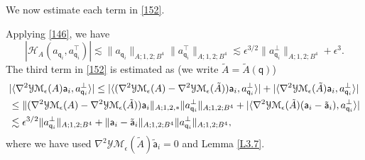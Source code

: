 \documentclass[11pt]{article}
\numberwithin{equation}{section} \setlength{\topmargin}{-35pt}
\newcommand{\YMe}{\mathcal{YM}_{\epsilon}}
\newcommand{\q}{\mathsf{q}}
\newcommand{\A}{\mathsf{a}}
\begin{document}
We now estimate each term in \eqref{152}.

\noindent Applying \eqref{146}, we have
\begin{equation}
\label{153}
|\mathcal{H}_A(a_{\q_i},a_{\q_i}^{\intercal})|\lesssim\|a_{\q_i}\|_{A;1,2;B^4}\|a_{\q_i}^{\intercal}\|_{A;1,2;B^4}
\lesssim\epsilon^{3/2}\|a_{\q_i}^{\perp}\|_{A;1,2;B^4}+\epsilon^3.
\end{equation}
The third term in \eqref{152} is estimated as (we write
$\tilde{A}=\tilde{A}(\q)$)
\begin{align}
\label{154}  &|\langle\nabla^2\YMe(A)\A_i,a_{\q_i}^{\perp}\rangle|
\le|\langle(\nabla^2\YMe(A)-\nabla^2\YMe(\tilde{A}))\A_i,a_{\q_i}^{\perp}\rangle|+
|\langle\nabla^2\YMe(\tilde{A})\A_i,a_{\q_i}^{\perp}\rangle|\notag\\
&\le\|(\nabla^2\YMe(A)-\nabla^2\YMe(\tilde{A}))\A_i\|_{A;1,2,\ast}\|a_{\q_i}^{\perp}\|_{A;1,2;B^4}+
|\langle\nabla^2\YMe(\tilde{A})(\A_i-\tilde{\A}_i),a_{\q_i}^{\perp}\rangle|\notag\\
&\lesssim\epsilon^{3/2}\|a_{\q_i}^{\perp}\|_{A;1,2;B^4}+\|\A_i-
\tilde{\A}_i\|_{A;1,2;B^4}\|a_{\q_i}^{\perp}\|_{A;1,2;B^4},
\end{align}
where we have used $\nabla^2\YMe(\tilde{A})\tilde{\A}_i=0$ and Lemma
\ref{L3.7}.
\end{document}
